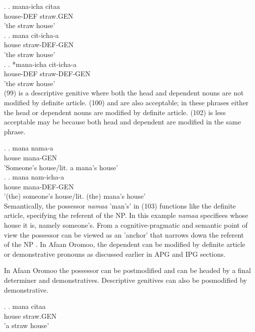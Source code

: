 \documentclass[11pt,a4paper]{article}
\begin{document}
	\ex.
	\ag.
	mana-icha citaa \\
	house-DEF straw.GEN\\
	'the straw house'\\
	
	\ex.
	\ag.
	mana cit-icha-a \\
	house straw-DEF-GEN\\
	'the straw house'\\
	
	\ex.
	\ag.
	*mana-icha cit-icha-a \\
	house-DEF straw-DEF-GEN\\
	'the straw house'\\
	
	(99) is a descriptive genitive where both the head and dependent nouns are not modified by definite article. (100) and are also acceptable; in these phrases either the head or dependent nouns are modified by definite article. (102) is less acceptable may be because both head and dependent are modified in the same phrase. 
		
	\ex.
	\ag.
	mana nama-a\\
	house mana-GEN\\
	'Someone's house/lit. a mana's house'\\
	

	\ex.
	\ag.
	mana nam-icha-a\\
	house mana-DEF-GEN\\
	'(the) someone's house/lit. (the) mana's house'\\
	
	Semantically, the possessor \emph{namaa} 'man's' in (103) functions like the definite article, specifying the referent of the NP. In this example \emph{namaa} specifiees whose house it is, namely someone's. From a cognitive-pragmatic and semantic point of view the possessor can be viewed as an 'anchor' that narrows down the referent of the NP \cite[80]{rosenbach2006descriptive}. In Afaan Oromoo, the dependent can be modified by definite article or demonstrative pronouns as discussed earlier in APG and IPG sections.
	
	In Afaan Oromoo the possessor can be postmodified and can be headed by a final determiner and demonstratives. Descriptive genitives can also be posmodified by demonstrative.
	
	\ex.
	\ag.
	mana citaa \\
	house straw.GEN\\
	'a straw house'\\
	
\end{document}
